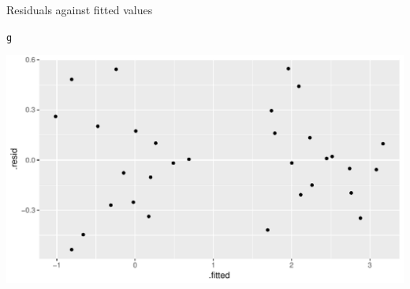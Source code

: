 \documentclass[unknownkeysallowed]{beamer}\usepackage[]{graphicx}\usepackage[]{color}
\makeatletter
\def\maxwidth{ %
  \ifdim\Gin@nat@width>\linewidth
    \linewidth
  \else
    \Gin@nat@width
  \fi
}
\newcommand{\hlstd}[1]{\textcolor[rgb]{0.345,0.345,0.345}{#1}}%
\newenvironment{kframe}{%
 \def\at@end@of@kframe{}%
 \ifinner\ifhmode%
  \def\at@end@of@kframe{\end{minipage}}%
  \begin{minipage}{\columnwidth}%
 \fi\fi%
 \def\FrameCommand##1{\hskip\@totalleftmargin \hskip-\fboxsep
 \colorbox{shadecolor}{##1}\hskip-\fboxsep
     \hskip-\linewidth \hskip-\@totalleftmargin \hskip\columnwidth}%
 \MakeFramed {\advance\hsize-\width
   \@totalleftmargin\z@ \linewidth\hsize
   \@setminipage}}%
 {\par\unskip\endMakeFramed%
 \at@end@of@kframe}
\newenvironment{knitrout}{}{} %
\makeatother
\begin{document}
\begin{frame}[fragile]{Residuals against fitted values}
  
\begin{knitrout}
\color{fgcolor}\begin{kframe}
\begin{alltt}
\hlstd{g}
\end{alltt}
\end{kframe}
\includegraphics[width=\maxwidth]{figure/unnamed-chunk-316-1} 

\end{knitrout}
  
\end{frame}
\end{document}
